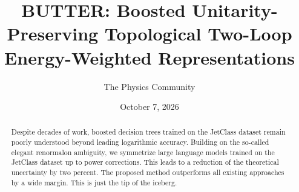 \documentclass[11pt]{article}
\title{BUTTER: Boosted Unitarity-Preserving Topological Two-Loop Energy-Weighted Representations}
\author{The Physics Community}
\date{October 7, 2026}
\begin{document}
\maketitle
\begin{abstract}
Despite decades of work, boosted decision trees trained on the JetClass
dataset remain poorly understood beyond leading logarithmic accuracy.
Building on the so-called elegant renormalon ambiguity, we symmetrize
large language models trained on the JetClass dataset up to power
corrections. This leads to a reduction of the theoretical uncertainty by
two percent. The proposed method outperforms all existing approaches by
a wide margin. This is just the tip of the iceberg.
\end{abstract}
\tableofcontents





\nocite{*}


\end{document}
